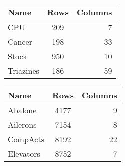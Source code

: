 
\begin{tabular}{lcr}
	\toprule
	\textbf{Name} & \textbf{Rows} & \textbf{Columns} \\\midrule
	CPU           & 209           & 7                \\
	Cancer        & 198           & 33               \\
	Stock         & 950           & 10               \\
	Triazines     & 186           & 59               \\\bottomrule
\end{tabular}
\hspace{2em}
\begin{tabular}{lcr}
	\toprule
	\textbf{Name} & \textbf{Rows} & \textbf{Columns} \\\midrule
	Abalone       & 4177          & 9                \\
	Ailerons      & 7154          & 8                \\
	CompActs      & 8192          & 22               \\
	Elevators     & 8752          & 7                \\\bottomrule
\end{tabular}



